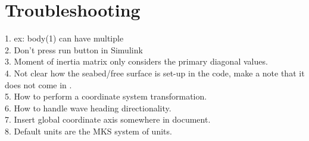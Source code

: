 \chapter{Troubleshooting}
1. ex: body(1) can have multiple \\
2. Don't press run button in Simulink \\
3. Moment of inertia matrix only considers the primary diagonal values.\\
4. Not clear how the seabed/free surface is set-up in the code, make a note that it does not come in .\\
5. How to perform a coordinate system transformation.\\
6.  How to handle wave heading directionality.\\
7.  Insert global coordinate axis somewhere in document.\\
8.  Default units are the MKS system of units. \\